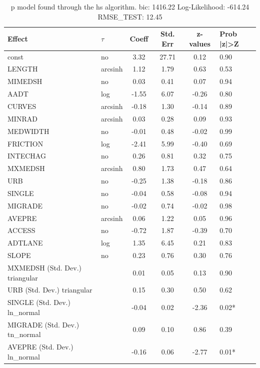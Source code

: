 \begin{table}
	\caption{p model found through the hs algorithm. bic: 1416.22 Log-Likelihood: -614.24 RMSE_TEST: 12.45}
	\begin{center}
		\begin{tabular}{|l|l|c|c|c|l|}
			\hline
			Effect & $\tau$ & Coeff & Std. Err & z-values & Prob |z|>Z \\
			\hline
			const & no & 3.32 & 27.71 & 0.12 & 0.90 \\
			\hline
			LENGTH & arcsinh & 1.12 & 1.79 & 0.63 & 0.53 \\
			\hline
			MIMEDSH & no & 0.03 & 0.41 & 0.07 & 0.94 \\
			\hline
			AADT & log & -1.55 & 6.07 & -0.26 & 0.80 \\
			\hline
			CURVES & arcsinh & -0.18 & 1.30 & -0.14 & 0.89 \\
			\hline
			MINRAD & arcsinh & 0.03 & 0.28 & 0.09 & 0.93 \\
			\hline
			MEDWIDTH & no & -0.01 & 0.48 & -0.02 & 0.99 \\
			\hline
			FRICTION & log & -2.41 & 5.99 & -0.40 & 0.69 \\
			\hline
			INTECHAG & no & 0.26 & 0.81 & 0.32 & 0.75 \\
			\hline
			MXMEDSH & arcsinh & 0.80 & 1.73 & 0.47 & 0.64 \\
			\hline
			URB & no & -0.25 & 1.38 & -0.18 & 0.86 \\
			\hline
			SINGLE & no & -0.04 & 0.58 & -0.08 & 0.94 \\
			\hline
			MIGRADE & no & -0.02 & 0.74 & -0.02 & 0.98 \\
			\hline
			AVEPRE & arcsinh & 0.06 & 1.22 & 0.05 & 0.96 \\
			\hline
			ACCESS & no & -0.72 & 1.87 & -0.39 & 0.70 \\
			\hline
			ADTLANE & log & 1.35 & 6.45 & 0.21 & 0.83 \\
			\hline
			SLOPE & no & 0.23 & 0.76 & 0.30 & 0.76 \\
			\hline
			MXMEDSH (Std. Dev.) triangular &  & 0.01 & 0.05 & 0.13 & 0.90 \\
			\hline
			URB (Std. Dev.) triangular &  & 0.15 & 0.30 & 0.50 & 0.62 \\
			\hline
			SINGLE (Std. Dev.) ln_normal &  & -0.04 & 0.02 & -2.36 & 0.02* \\
			\hline
			MIGRADE (Std. Dev.) tn_normal &  & 0.09 & 0.10 & 0.86 & 0.39 \\
			\hline
			AVEPRE (Std. Dev.) ln_normal &  & -0.16 & 0.06 & -2.77 & 0.01* \\

\end{tabular}
\end{center}
\end{table}
